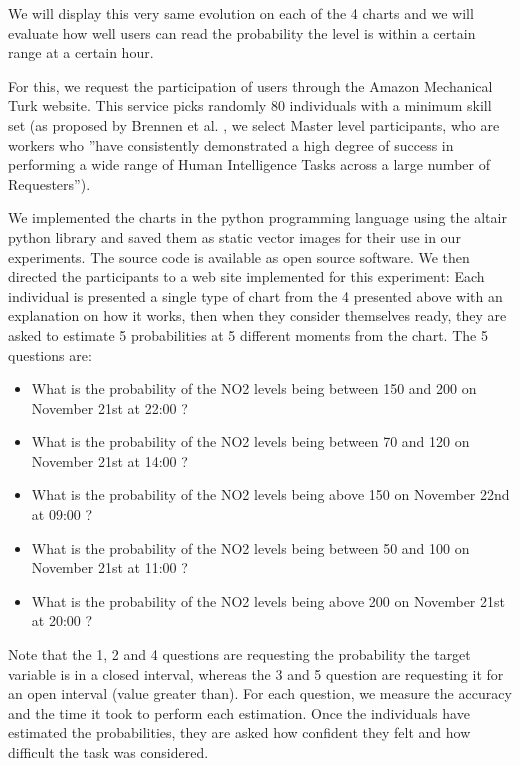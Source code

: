 \documentclass[a4paper,3p,sort&compress]{elsarticle}
\begin{document}
We will display this very same evolution on each of the 4 charts and we will evaluate how well users can 
read the probability the \no level is within a certain range at a certain hour. 

For this, we request the participation of users through the Amazon Mechanical Turk website. 
This service picks randomly 80 individuals with a minimum skill set (as proposed by Brennen 
et al. \cite{brennen_instrument_2018}, we select Master level participants, who are workers who 
''have consistently demonstrated a high degree of success in performing a wide range of Human Intelligence Tasks across a 
large number of Requesters'').

We implemented the charts in the python programming language using the altair python library 
\cite{vanderplas2018altair} and saved them as static vector images for their use in our experiments. The source code is 
available as open source software. We then directed the participants to a web site implemented for this experiment: 
Each individual is presented a 
single type of chart from the 4 presented above with an explanation on how it works, 
then when they consider themselves ready, they are asked to estimate 5 probabilities at 5 different moments from the chart. 
The 5 questions are:
\begin{itemize}
  \item What is the probability of the NO2 levels being between 150 and 200 on November 21st at 22:00 ?
  \item What is the probability of the NO2 levels being between 70 and 120 on November 21st at 14:00 ?
  \item What is the probability of the NO2 levels being above 150 on November 22nd at 09:00 ?
  \item What is the probability of the NO2 levels being between 50 and 100 on November 21st at 11:00 ?
  \item What is the probability of the NO2 levels being above 200 on November 21st at 20:00 ?
\end{itemize}

Note that the 1, 2 and 4 questions are requesting the probability the target variable is in a closed interval, whereas
the 3 and 5 question are requesting it for an open interval (value greater than). 
For each question, we measure the accuracy and the time it took to 
perform each estimation. Once the individuals have estimated the probabilities, they are asked how confident they 
felt and how difficult the task was considered.
\end{document}
